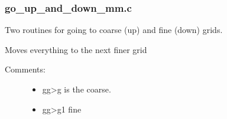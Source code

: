 \documentclass[letterpaper,10pt,english]{sphinxmanual}
\begin{document}
\subsubsection{go\_up\_and\_down\_mm.c}
\label{\detokenize{sphinx-c-apidoc/output/gravity/mond_mass/go_up_and_down_mm_c:go-up-and-down-mm-c}}\label{\detokenize{sphinx-c-apidoc/output/gravity/mond_mass/go_up_and_down_mm_c::doc}}
Two routines for going to coarse (up) and fine (down) grids.

\begin{fulllineitems}
\label{\detokenize{sphinx-c-apidoc/output/gravity/mond_mass/go_up_and_down_mm_c:c.go_down_mm}}%
\pysigstartmultiline
{}%
\pysigstopmultiline
Moves everything to the next finer grid
\begin{description}
\item[{Comments:}] \leavevmode\begin{itemize}
\item {} 
gg\sphinxhyphen{}\textgreater{}g is the coarse.

\item {} 
gg\sphinxhyphen{}\textgreater{}g\sphinxhyphen{}1 fine

\end{itemize}

\end{description}

\end{fulllineitems}

\end{document}
